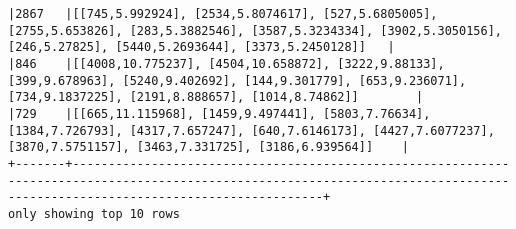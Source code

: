 \documentclass[11pt]{article}
\begin{document}
\begin{Verbatim}[commandchars=\\\{\}]
|2867   |[[745,5.992924], [2534,5.8074617], [527,5.6805005], [2755,5.653826], [283,5.3882546], [3587,5.3234334], [3902,5.3050156], [246,5.27825], [5440,5.2693644], [3373,5.2450128]]   |
|846    |[[4008,10.775237], [4504,10.658872], [3222,9.88133], [399,9.678963], [5240,9.402692], [144,9.301779], [653,9.236071], [734,9.1837225], [2191,8.888657], [1014,8.74862]]        |
|729    |[[665,11.115968], [1459,9.497441], [5803,7.76634], [1384,7.726793], [4317,7.657247], [640,7.6146173], [4427,7.6077237], [3870,7.5751157], [3463,7.331725], [3186,6.939564]]    |
+-------+-------------------------------------------------------------------------------------------------------------------------------------------------------------------------------+
only showing top 10 rows


    \end{Verbatim}


    
    
    
    
\end{document}
